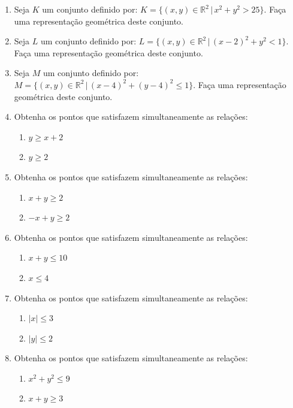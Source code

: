 \documentclass[11pt,a4paper]{article}
\begin{document}
\begin{enumerate}
\item Seja $K$ um conjunto definido por: $K = \{(x,y) \in \mathbb{R}^2 \,|\, x^2 + y^2 > 25 \}$. Faça uma representação geométrica deste conjunto.

\item Seja $L$ um conjunto definido por: $L = \{(x,y) \in \mathbb{R}^2 \,|\, (x - 2)^2 + y^2 < 1 \}$. Faça uma representação geométrica deste conjunto.

\item Seja $M$ um conjunto definido por: $M = \{(x,y) \in \mathbb{R}^2 \,|\, (x - 4)^2 + (y - 4)^2 \leq 1 \}$. Faça uma representação geométrica deste conjunto.

\item Obtenha os pontos que satisfazem simultaneamente as relações: 
	\begin{enumerate}[label=(\roman*)]
	\item $y \geq x + 2$
	\item $y \geq 2$
	\end{enumerate}
	
\item Obtenha os pontos que satisfazem simultaneamente as relações: 
	\begin{enumerate}[label=(\roman*)]
	\item $x + y \geq 2$
	\item $-x + y \geq 2$
	\end{enumerate}
	
\item Obtenha os pontos que satisfazem simultaneamente as relações: 
	\begin{enumerate}[label=(\roman*)]
	\item $x + y \leq 10$
	\item $x \leq 4$
	\end{enumerate}
	
	
	
	
	
	
	
	
	
\item Obtenha os pontos que satisfazem simultaneamente as relações: 
	\begin{enumerate}[label=(\roman*)]
	\item $|x| \leq 3$
	\item $|y| \leq 2$
	\end{enumerate}
	
\item Obtenha os pontos que satisfazem simultaneamente as relações: 
	\begin{enumerate}[label=(\roman*)]
	\item $x^2 + y^2 \leq 9$
	\item $x + y \geq 3$
	\end{enumerate}


\end{enumerate}
\end{document}

